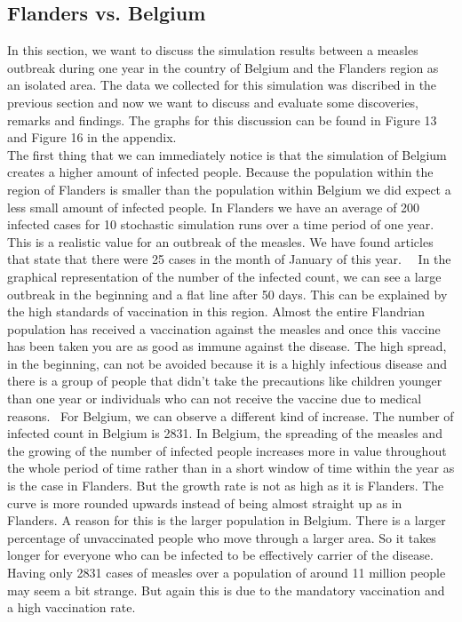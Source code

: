 \documentclass[runningheads]{llncs}
\begin{document}
	\subsection{Flanders vs. Belgium}
	
	In this section, we want to discuss the simulation results between a measles outbreak during one year in the country of Belgium and the Flanders region as an isolated area. The data we collected for this simulation was discribed in the previous section and now we want to discuss and evaluate some discoveries, remarks and findings. The graphs for this discussion can be found in Figure 13 and Figure 16 in the appendix.\\
	
	The first thing that we can immediately notice is that the simulation of Belgium creates a higher amount of infected people. Because the population within the region of Flanders is smaller than the population within Belgium we did expect a less small amount of infected people. In Flanders we have an average of 200 infected cases for 10 stochastic simulation runs over a time period of one year. This is a realistic value for an outbreak of the measles. We have found articles that state that there were 25 cases in the month of January of this year.~\cite{18}~\cite{13} In the graphical representation of the number of the infected count, we can see a large outbreak in the beginning and a flat line after 50 days. This can be explained by the high standards of vaccination in this region. Almost the entire Flandrian population has received a vaccination against the measles and once this vaccine has been taken you are as good as immune against the disease. The high spread, in the beginning, can not be avoided because it is a highly infectious disease and there is a group of people that didn't take the precautions like children younger than one year or individuals who can not receive the vaccine due to medical reasons.~\cite{20} 
	For Belgium, we can observe a different kind of increase. The number of infected count in Belgium is 2831. In Belgium, the spreading of the measles and the growing of the number of infected people increases more in value throughout the whole period of time rather than in a short window of time within the year as is the case in Flanders. But the growth rate is not as high as it is Flanders. The curve is more rounded upwards instead of being almost straight up as in Flanders. A reason for this is the larger population in Belgium. There is a larger percentage of unvaccinated people who move through a larger area. So it takes longer for everyone who can be infected to be effectively carrier of the disease. Having only 2831 cases of measles over a population of around 11 million people may seem a bit strange. But again this is due to the mandatory vaccination and a high vaccination rate.\\
	
\end{document}
